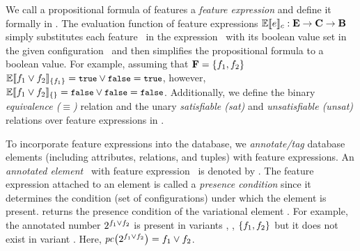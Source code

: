 We call a propositional formula of features a \emph{feature expression} and define
it formally in . 
The evaluation function of feature expressions 
$\fSem \dimMeta : \ffSet \to \confSet \to \bSet$ simply substitutes each
feature \fName\ in the expression \dimMeta\ with its boolean value 
set in the given configuration \config\ and then
simplifies the propositional formula to a boolean value.
For example, assuming that 
\ensuremath{\fSet = \setDef{\A, \B}}
 $\fSem [\{\A\}] {\A \vee \B} = \t \vee \f = \t$, however,
$\fSem [\{\}] {\A \vee \B} = \f \vee \f = \f$.
Additionally, we define the binary \emph{equivalence ($\equiv$)} relation and
the unary \emph{satisfiable (sat)} and \emph{unsatisfiable (unsat)}
relations over feature expressions in .
%

To incorporate feature expressions into the database,
we \emph{annotate/tag} database elements (including attributes, relations, and tuples) 
with feature expressions. An \emph{annotated element} \elem\ with feature expression \dimMeta\
is denoted by \annot \elem. 
%
The feature expression attached to an element is called a \emph{presence condition}
since it determines the condition (set of configurations) under which the element is present.
\getPC {\annot \elem} returns the presence condition of the variational element
\annot \elem.
For example, the
annotated number $\annot [\A \vee \B] 2$ is present in variants
\setDef \A, \setDef \B, 
\ensuremath{\setDef {\A, \B}}
but it does not exist in variant \setDef {}.
Here, $\getPC {\annot [\A \vee \B] 2} = \A \vee \B$.

